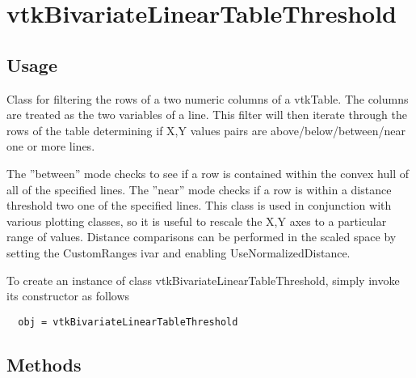 \section{vtkBivariateLinearTableThreshold}

\subsection{Usage}

 Class for filtering the rows of a two numeric columns of a vtkTable.  The
 columns are treated as the two variables of a line.  This filter will
 then iterate through the rows of the table determining if X,Y values pairs
 are above/below/between/near one or more lines.  

 The ''between'' mode checks to see if a row is contained within the convex 
 hull of all of the specified lines.  The ''near'' mode checks if a row is
 within a distance threshold two one of the specified lines.  This class
 is used in conjunction with various plotting classes, so it is useful
 to rescale the X,Y axes to a particular range of values.  Distance 
 comparisons can be performed in the scaled space by setting the CustomRanges
 ivar and enabling UseNormalizedDistance.

To create an instance of class vtkBivariateLinearTableThreshold, simply
invoke its constructor as follows
\begin{verbatim}
  obj = vtkBivariateLinearTableThreshold
\end{verbatim}
\subsection{Methods}

